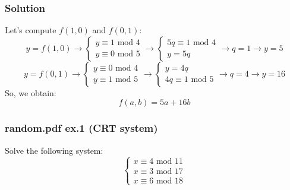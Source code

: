 \documentclass[11pt, a4paper]{article}
\newcommand{\mymod}{
    \text{ mod }
}
\begin{document}
\subsubsection*{Solution}
Let's compute $f(1,0)$ and $f(0,1)$:
\begin{equation*}
    y=f(1,0)\longrightarrow
    \begin{cases}
        y\equiv1\mymod4\\
        y\equiv0\mymod5
    \end{cases}
    \longrightarrow
    \begin{cases}
        5q\equiv1\mymod4\\
        y=5q
    \end{cases}
    \longrightarrow q=1\longrightarrow y=5
\end{equation*}
\begin{equation*}
    y=f(0,1)\longrightarrow
    \begin{cases}
        y\equiv0\mymod4\\
        y\equiv1\mymod5
    \end{cases}
    \longrightarrow
    \begin{cases}
        y=4q\\
        4q\equiv1\mymod5
    \end{cases}
    \longrightarrow q=4\longrightarrow y=16
\end{equation*}
So, we obtain:
$$f(a,b)=5a+16b$$

\newpage
\subsubsection{random.pdf ex.1 (CRT system)}
Solve the following system:
\begin{equation*}
    \begin{cases}
        x\equiv4\mymod11\\
        x\equiv3\mymod17\\
        x\equiv6\mymod18
    \end{cases}
\end{equation*}
\end{document}
